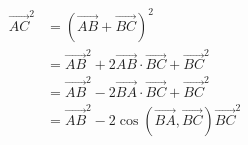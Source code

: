 \documentclass[preview]{standalone}
\begin{document}
\begin{align*}
\overrightarrow{AC}^2 &= (\overrightarrow{AB} + \overrightarrow{BC})^2\\&= \overrightarrow{AB}^2 + 2\overrightarrow{AB}\cdot\overrightarrow{BC} + \overrightarrow{BC}^2\\&= \overrightarrow{AB}^2 - 2\overrightarrow{BA}\cdot\overrightarrow{BC} + \overrightarrow{BC}^2\\&= \overrightarrow{AB}^2 -2\cos\left(\overrightarrow{BA},\overrightarrow{BC}\right)\overrightarrow{BC}^2\\
\end{align*}
\end{document}
